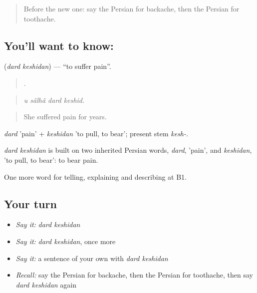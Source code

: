 \label{lesson:FA-C491-dard-keshidan}



\begin{quote}
Before the new one: say the Persian for backache, then the Persian for toothache.
\end{quote}

\subsection*{You'll want to know:  }
\textbf{ } (\emph{dard keshidan}) — \textquotedblleft{}to suffer pain\textquotedblright{}.

\begin{quote}
   .
\end{quote}

\begin{quote}
\emph{u sâlhâ dard keshid.}
\end{quote}

\begin{quote}
She suffered pain for years.
\end{quote}

\emph{dard} 'pain' + \emph{keshidan} 'to pull, to bear'; present stem \emph{kesh-}.

\begin{cousinweb}
\emph{dard keshidan} is built on two inherited Persian words, \emph{dard}, 'pain', and \emph{keshidan}, 'to pull, to bear': to bear pain.
\end{cousinweb}

\begin{grammarlens}[title={What you've built}]
One more word for telling, explaining and describing at B1.
\end{grammarlens}

\subsection*{Your turn}
\begin{itemize}
\raggedright
  \item \emph{Say it:} \emph{dard keshidan}
  \item \emph{Say it:} \emph{dard keshidan}, once more
  \item \emph{Say it:} a sentence of your own with \emph{dard keshidan}
  \item \emph{Recall:} say the Persian for backache, then the Persian for toothache, then say \emph{dard keshidan} again
\end{itemize}

